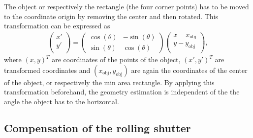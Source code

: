 The object or respectively the rectangle (the four corner points) has to be moved to the coordinate origin by removing the center and then rotated.
This transformation can be expressed as
\begin{align*}
	\begin{pmatrix}
	x'\\
	y'\\
	\end{pmatrix}=
	\begin{pmatrix}
	\cos(\theta)&-\sin(\theta)\\
	\sin(\theta)&\cos(\theta)
	\end{pmatrix}
	\begin{pmatrix}
	x-x_{\text{obj}}\\
	y-y_{\text{obj}}\\
	\end{pmatrix},	
\end{align*}
where $(x, y)^T$ are coordinates of the points of the object, $(x', y')^T$ are transformed coordinates and $(x_{\text{obj}}, y_{\text{obj}})$ are again the coordinates of the center of the object, or respectively the min area rectangle.
By applying this transformation beforehand, the geometry estimation is independent of the the angle the object has to the horizontal. 

\subsection{Compensation of the rolling shutter}


